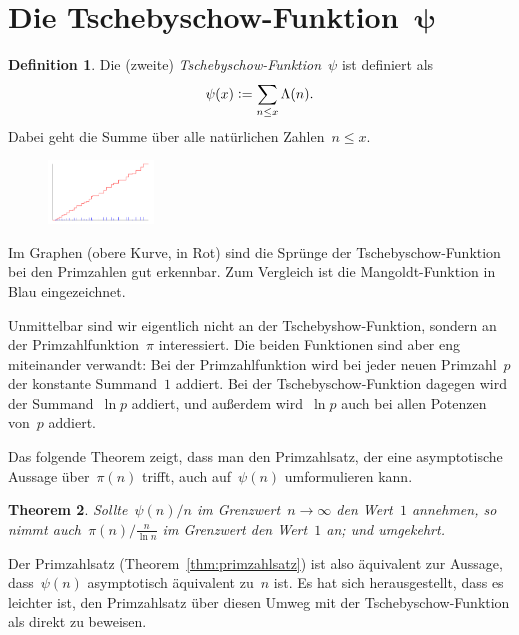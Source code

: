 \documentclass[twoside]{../zirkelblatt1415}
\theoremstyle{definition}
\newtheorem{defn}{Definition}[section]
\theoremstyle{plain}
\newtheorem{thm}[defn]{Theorem}
\theoremstyle{remark}
\newcommand{\defeq}{\vcentcolon=}
\begin{document}
\section{\texorpdfstring{Die Tschebyschow-Funktion~$\boldsymbol{\psi}$}{Die
Tschebyschow-Funktion~ψ}}

\begin{defn}Die (zweite) \emph{Tschebyschow-Funktion}~$\psi$ ist definiert als
\[ \psi(x) \defeq \sum_{n \leq x} \Lambda(n). \]
Dabei geht die Summe über alle natürlichen Zahlen~$n \leq x$.\end{defn}

\begin{figure}
  \vspace{-2em}
  \includegraphics[width=0.25\textwidth]{chebyshev-function}
\end{figure}
Im Graphen (obere Kurve, in Rot) sind die Sprünge der Tschebyschow-Funktion bei
den Primzahlen gut erkennbar. Zum Vergleich ist die Mangoldt-Funktion in Blau
eingezeichnet.

Unmittelbar sind wir eigentlich nicht an der Tschebyshow-Funktion, sondern an
der Primzahlfunktion~$\pi$ interessiert. Die beiden Funktionen sind aber eng
miteinander verwandt: Bei der Primzahlfunktion wird bei jeder neuen
Primzahl~$p$ der konstante Summand~$1$ addiert. Bei der Tschebyschow-Funktion
dagegen wird der Summand~$\ln p$ addiert, und außerdem wird~$\ln p$ auch bei
allen Potenzen von~$p$ addiert.

Das folgende Theorem zeigt, dass man den Primzahlsatz, der eine asymptotische
Aussage über~$\pi(n)$ trifft, auch auf~$\psi(n)$ umformulieren kann.

\begin{thm}\label{thm:psi-pi}
Sollte~$\psi(n)/n$ im Grenzwert~$n \to \infty$ den Wert~$1$ annehmen, so nimmt
auch~$\pi(n)/\frac{n}{\ln n}$ im Grenzwert den Wert~$1$ an; und umgekehrt.
\end{thm}

Der Primzahlsatz (Theorem~\ref{thm:primzahlsatz}) ist also äquivalent zur
Aussage, dass~$\psi(n)$ asymptotisch äquivalent zu~$n$ ist. Es hat sich
herausgestellt, dass es leichter ist, den Primzahlsatz über diesen Umweg mit
der Tschebyschow-Funktion als direkt zu beweisen.
\end{document}
